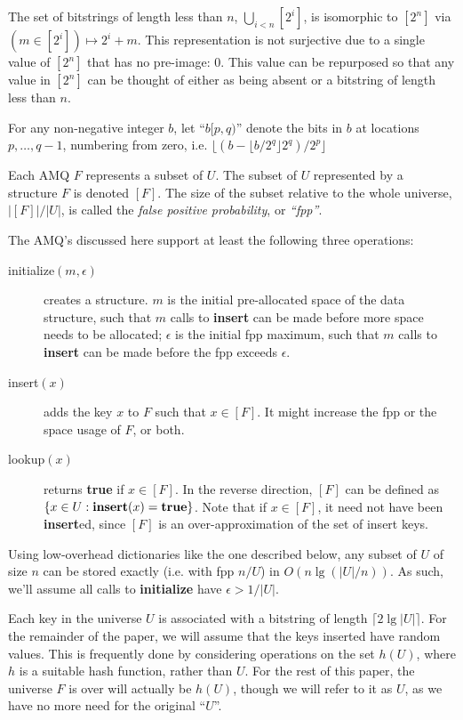 \documentclass[11pt,letterpaper]{article}
\begin{document}
The set of bitstrings of length less than $n$,  $\bigcup_{i < n} [2^i]$, is isomorphic to $[2^n]$ via $(m \in [2^i]) \mapsto 2^i + m$.
This representation is not surjective due to a single value of $[2^n]$ that has no pre-image: $0$.
This value can be repurposed so that any value in $[2^n]$ can be thought of either as being absent or a bitstring of length less than $n$.

For any non-negative integer $b$, let ``$b[p,q)$'' denote the bits in $b$ at locations $p, \dots, q-1$, numbering from zero, i.e. $\lfloor (b - \lfloor b/2^q \rfloor 2^q)/2^p \rfloor$

Each AMQ $F$ represents a subset of $U$.
The subset of $U$ represented by a structure $F$ is denoted $[F]$.
The size of the subset relative to the whole universe, $|[F]|/|U|$, is called the {\em false positive probability}, or {\em ``fpp''}.

The AMQ's discussed here support at least the following three operations:

\begin{description}
\item[initialize$(m, \epsilon)$] creates a structure.
  $m$ is the initial pre-allocated space of the data structure, such that $m$ calls to {\bf insert} can be made before more space needs to be allocated;
  $\epsilon$ is the initial fpp maximum, such that $m$ calls to {\bf insert} can be made before the fpp exceeds $\epsilon$.
\item[insert$(x)$] adds the key $x$ to $F$ such that $x \in [F]$.
  It might increase the fpp or the space usage of $F$, or both.
\item[lookup$(x)$] returns {\bf true} if $x \in [F]$.
  In the reverse direction, $[F]$ can be defined as $\{x \in U : {\bf insert}(x) = {\bf true}\}$.
  Note that if $x \in [F]$, it need not have been {\bf insert}ed, since $[F]$ is an over-approximation of the set of insert keys.
\end{description}

Using low-overhead dictionaries like the one described below, any subset of $U$ of size $n$ can be stored exactly (i.e. with fpp $n/U$) in $O(n \lg (|U|/n))$.
As such, we'll assume all calls to {\bf initialize} have $\epsilon > 1/|U|$.

Each key in the universe $U$ is associated with a bitstring of length $\lceil 2 \lg |U| \rceil$.
For the remainder of the paper, we will assume that the keys inserted have random values.
This is frequently done by considering operations on the set $h(U)$, where $h$ is a suitable hash function, rather than $U$.
For the rest of this paper, the universe $F$ is over will actually be $h(U)$, though we will refer to it as $U$, as we have no more need for the original ``$U$''.
\end{document}
